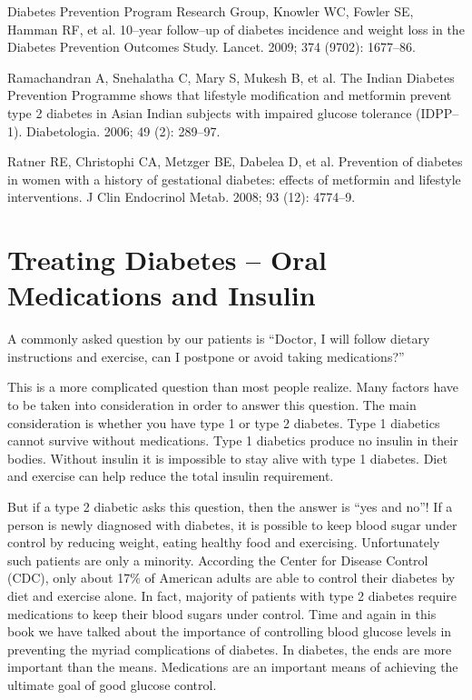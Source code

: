 \begin{thebibliography}{99}
 Diabetes Prevention Program Research Group, Knowler WC, Fowler SE, Hamman RF, et al. 10–year follow–up of diabetes incidence and weight loss in the Diabetes Prevention Outcomes Study. Lancet. 2009; 374 (9702): 1677–86.

  Ramachandran A, Snehalatha C, Mary S, Mukesh B, et al. The Indian Diabetes Prevention Programme shows that lifestyle modification and metformin prevent type 2 diabetes in Asian Indian subjects with impaired glucose tolerance (IDPP–1). Diabetologia. 2006; 49 (2): 289–97.

  Ratner RE, Christophi CA, Metzger BE, Dabelea D, et al. Prevention of diabetes in women with a history of gestational diabetes: effects of metformin and lifestyle interventions. J Clin Endocrinol Metab. 2008; 93 (12): 4774–9.

 \end{thebibliography}


\chapter{Treating Diabetes – Oral Medications and Insulin}

A commonly asked question by our patients is “Doctor, I will follow dietary instructions and exercise, can I postpone or avoid taking medications?”

This is a more complicated question than most people realize. Many factors have to be taken into consideration in order to answer this question. The main consideration is whether you have type 1 or type 2 diabetes. Type 1 diabetics cannot survive without medications. Type 1 diabetics produce no insulin in their bodies. Without insulin it is impossible to stay alive with type 1 diabetes. Diet and exercise can help reduce the total insulin requirement.

But if a type 2 diabetic asks this question, then the answer is “yes and no”! If a person is newly diagnosed with diabetes, it is possible to keep blood sugar under control by reducing weight, eating healthy food and exercising. Unfortunately such patients are only a minority. According the Center for Disease Control (CDC), only about 17\% of American adults are able to control their diabetes by diet and exercise alone. In fact, majority of patients with type 2 diabetes require medications to keep their blood sugars under control. Time and again in this book we have talked about the importance of controlling blood glucose levels in preventing the myriad complications of diabetes. In diabetes, the ends are more important than the means. Medications are an important means of achieving the ultimate goal of good glucose control.

